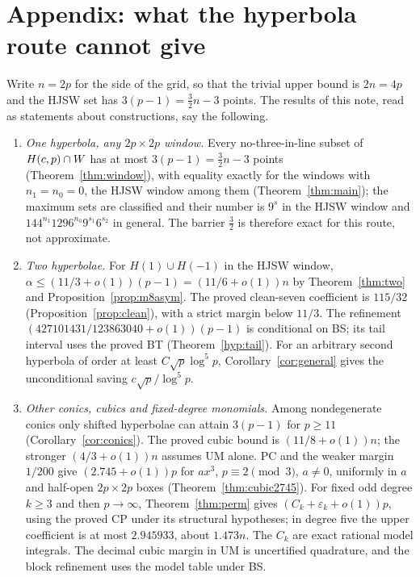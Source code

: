 \section*{Appendix: what the hyperbola route cannot give}\label{app:hyperbolae}

Write $n=2p$ for the side of the grid, so that the trivial upper bound is $2n=4p$ and the HJSW set has $3(p-1)=\tfrac32 n-3$ points.
The results of this note, read as statements about constructions, say the following.

\begin{enumerate}
\item[(a)] \emph{One hyperbola, any $2p\times2p$ window.}  Every no-three-in-line subset of $H(c,p)\cap W$ has at most $3(p-1)=\tfrac32 n-3$ points
 (Theorem~\ref{thm:window}), with equality exactly for the windows with $n_1=n_0=0$, the HJSW window among them (Theorem~\ref{thm:main});
 the maximum sets are classified and their number is $9^s$ in the HJSW window and $144^{n_1}1296^{n_0}9^{s_1}6^{s_2}$ in general.
 The barrier $\tfrac32$ is therefore exact for this route, not approximate.
\item[(b)] \emph{Two hyperbolae.}  For $H(1)\cup H(-1)$ in the HJSW window,
$\alpha\le(11/3+o(1))(p-1)=(11/6+o(1))n$ by Theorem~\ref{thm:two} and Proposition~\ref{prop:m8asym}.
The proved clean-seven coefficient is $115/32$ (Proposition~\ref{prop:clean}), with a strict margin below $11/3$.
The refinement $(427101431/123863040+o(1))(p-1)$ is conditional on BS; its tail interval uses the proved BT (Theorem~\ref{hyp:tail}).
For an arbitrary second hyperbola of order at least $C\sqrt p\log^5p$, Corollary~\ref{cor:general} gives the unconditional saving $c\sqrt p/\log^5p$.
\item[(c)] \emph{Other conics, cubics and fixed-degree monomials.}
Among nondegenerate conics only shifted hyperbolae can attain $3(p-1)$ for $p\ge11$ (Corollary~\ref{cor:conics}).
The proved cubic bound is $(11/8+o(1))n$; the stronger $(4/3+o(1))n$ assumes UM alone.
PC and the weaker margin $1/200$ give $(2.745+o(1))p$ for $ax^3$, $p\equiv2\pmod3$, $a\ne0$,
uniformly in $a$ and half-open $2p\times2p$ boxes (Theorem~\ref{thm:cubic2745}).
For fixed odd degree $k\ge3$ and then $p\to\infty$, Theorem~\ref{thm:perm} gives $(C_k+\varepsilon_k+o(1))p$, using the proved CP under its structural hypotheses;
in degree five the upper coefficient is at most $2.945933$, about $1.473n$.
The $C_k$ are exact rational model integrals.  The decimal cubic margin in UM is uncertified quadrature, and the block refinement uses the model table under BS.
\end{enumerate}

